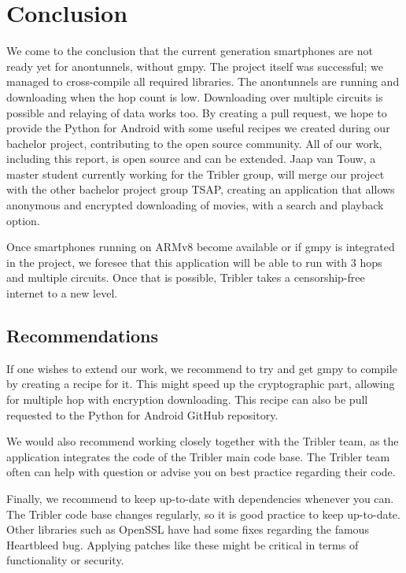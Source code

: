 \chapter{Conclusion}
	We come to the conclusion that the current generation smartphones are not ready yet for anontunnels, without gmpy. The project itself was successful; we managed to cross-compile all required libraries. The anontunnels are running and downloading when the hop count is low. Downloading over multiple circuits is possible and relaying of data works too. By creating a pull request, we hope to provide the Python for Android with some useful recipes we created during our bachelor project, contributing to the open source community. 
	All of our work, including this report, is open source and can be extended. Jaap van Touw, a master student currently working for the Tribler group, will merge our project with the other bachelor project group TSAP, creating an application that allows anonymous and encrypted downloading of movies, with a search and playback option.
	
	
	Once smartphones running on ARMv8 become available or if gmpy is integrated in the project, we foresee that this application will be able to run with 3 hops and multiple circuits. Once that is possible, Tribler takes a censorship-free internet to a new level.
	
	\section{Recommendations}
		If one wishes to extend our work, we recommend to try and get gmpy to compile by creating a recipe for it. This might speed up the cryptographic part, allowing for multiple hop with encryption downloading. This recipe can also be pull requested to the Python for Android GitHub repository.
		
		We would also recommend working closely together with the Tribler team, as the application integrates the code of the Tribler main code base. The Tribler team often can help with question or advise you on best practice regarding their code.
		
		Finally, we recommend to keep up-to-date with dependencies whenever you can. The Tribler code base changes regularly, so it is good practice to keep up-to-date. Other libraries such as OpenSSL have had some fixes regarding the famous Heartbleed bug. Applying patches like these might be critical in terms of functionality or security.
		
		
			
